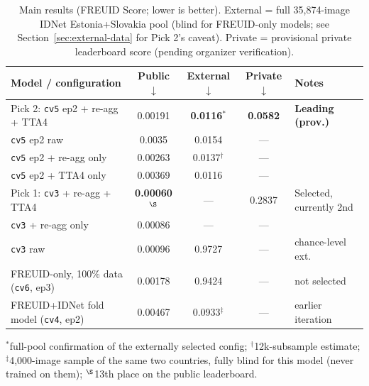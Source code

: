 \documentclass[11pt,a4paper]{article}
\begin{document}
\begin{table}[H]
  \centering
  \caption{Main results (FREUID Score; lower is better). External = full
  35{,}874-image IDNet Estonia+Slovakia pool (blind for FREUID-only models;
  see Section~\ref{sec:external-data} for Pick 2's caveat). Private = provisional
  private leaderboard score (pending organizer verification).}
  \label{tab:results}
  \small
  \setlength{\tabcolsep}{4.5pt}
  \begin{tabular}{lcccl}
    \toprule
    Model / configuration & Public $\downarrow$ & External $\downarrow$ & Private $\downarrow$ & Notes \\
    \midrule
    Pick 2: \texttt{cv5} ep2 + re-agg + TTA4  & 0.00191 & \textbf{0.0116}$^{*}$ & \textbf{0.0582} & \textbf{Leading (prov.)} \\
    \quad \texttt{cv5} ep2 raw                & 0.0035  & 0.0154 & --- & \\
    \quad \texttt{cv5} ep2 + re-agg only       & 0.00263 & 0.0137$^{\dagger}$ & --- & \\
    \quad \texttt{cv5} ep2 + TTA4 only         & 0.00369 & 0.0116 & --- & \\
    Pick 1: \texttt{cv3} + re-agg + TTA4       & \textbf{0.00060}$^{\S}$ & --- & 0.2837 & Selected, currently 2nd \\
    \quad \texttt{cv3} + re-agg only           & 0.00086 & ---    & --- & \\
    \quad \texttt{cv3} raw                     & 0.00096 & 0.9727 & --- & chance-level ext. \\
    FREUID-only, 100\% data (\texttt{cv6}, ep3) & 0.00178 & 0.9424 & --- & not selected \\
    FREUID+IDNet fold model (\texttt{cv4}, ep2) & 0.00467 & 0.0933$^{\ddagger}$ & --- & earlier iteration \\
    \bottomrule
  \end{tabular}
  \normalsize

  \vspace{2pt}
  {\footnotesize $^{*}$full-pool confirmation of the externally selected config;
  $^{\dagger}$12k-subsample estimate; $^{\ddagger}$4{,}000-image sample of the
  same two countries, fully blind for this model (never trained on them);
  $^{\S}$13th place on the public leaderboard.}
\end{table}
\end{document}
